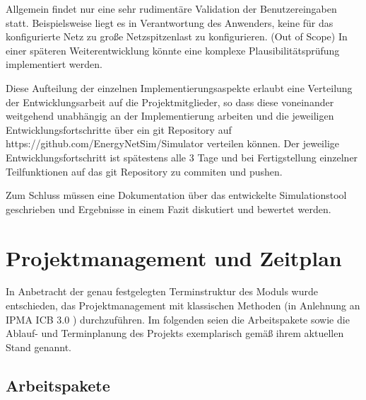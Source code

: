 \documentclass[12pt,titlepage]{article}
\begin{document}
Allgemein findet nur eine sehr rudimentäre Validation der Benutzereingaben statt. Beispielsweise liegt es in Verantwortung des Anwenders, keine für das konfigurierte Netz zu große Netzspitzenlast zu konfigurieren. (Out of Scope) In einer späteren Weiterentwicklung könnte eine komplexe Plausibilitätsprüfung implementiert werden.
 
Diese Aufteilung der einzelnen Implementierungsaspekte erlaubt eine Verteilung der Entwicklungsarbeit auf die Projektmitglieder, so dass diese voneinander weitgehend unabhängig an der Implementierung arbeiten und die jeweiligen Entwicklungsfortschritte über ein git Repository auf https://github.com/EnergyNetSim/Simulator verteilen können. Der jeweilige Entwicklungsfortschritt ist spätestens alle 3 Tage und bei Fertigstellung einzelner Teilfunktionen auf das git Repository zu commiten und pushen.
 
Zum Schluss müssen eine Dokumentation über das entwickelte Simulationstool geschrieben und Ergebnisse in einem Fazit diskutiert und bewertet werden. 

\section{Projektmanagement und Zeitplan}
In Anbetracht der genau festgelegten Terminstruktur des Moduls wurde entschieden, das Projektmanagement mit klassischen Methoden (in Anlehnung an IPMA ICB 3.0 \citep{icb}) durchzuführen. Im folgenden seien die Arbeitspakete sowie die Ablauf- und Terminplanung des Projekts exemplarisch gemäß ihrem aktuellen Stand genannt. 
 
\subsection{Arbeitspakete}
\end{document}
